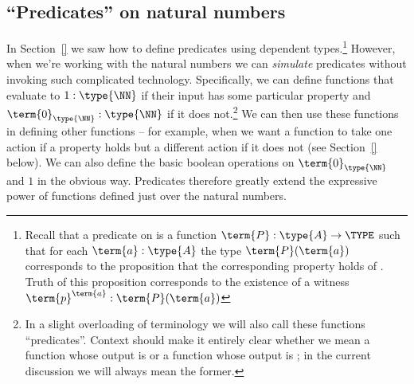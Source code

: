 \subsection{``Predicates'' on natural numbers}
\label{sec:NaturalNumbers-PredicatesOnN}

In Section~\ref{} we saw how to define predicates using dependent types.\footnote{
Recall that a predicate on  is a function $\term{P}: \type{A} \to \TYPE$ such that for each $\term{a}:\type{A}$ the type $\term{P}(\term{a})$ corresponds to the proposition that the corresponding property holds of .  Truth of this proposition corresponds to the existence of a witness 
$\term{p}^{\term{a}}:\term{P}(\term{a})$
}
However, when we're working with the natural numbers we can \emph{simulate} predicates without invoking such complicated technology.
Specifically, we can define functions that evaluate to $1:\type{\NN}$ if their input has some particular property and $\term{0}_{\type{\NN}}:\type{\NN}$ if it does not.\footnote{
In a slight overloading of terminology we will also call these functions ``predicates''.  Context should make it entirely clear whether we mean a function whose output is \type{\NN} or a function whose output is \TYPE; in the current discussion we will always mean the former.
}  
We can then use these functions in defining other functions -- for example, when we want a function to take one action if a property holds but a different action if it does not (see Section~\ref{} below).  We can also define the basic boolean operations on $\term{0}_{\type{\NN}}$ and $1$ in the obvious way.  Predicates therefore greatly extend the expressive power of functions defined just over the natural numbers.  

